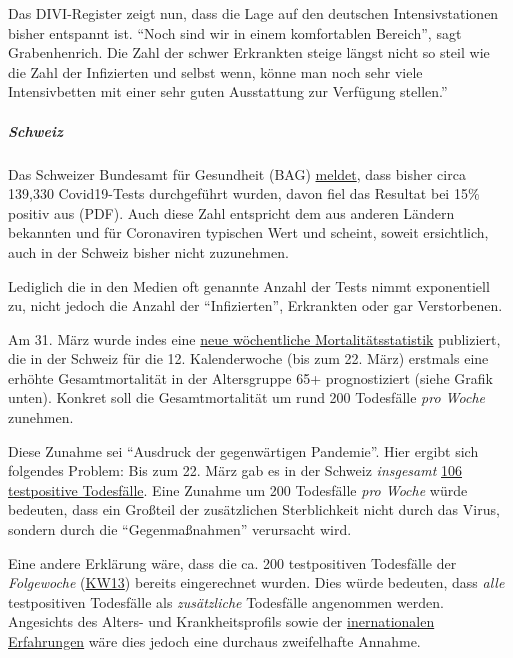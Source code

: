 Das DIVI-Register zeigt nun, dass die Lage auf den deutschen
Intensivstationen bisher entspannt ist. ``Noch sind wir in einem
komfortablen Bereich'', sagt Grabenhenrich. Die Zahl der schwer
Erkrankten steige längst nicht so steil wie die Zahl der Infizierten und
selbst wenn, könne man noch sehr viele Intensivbetten mit einer sehr
guten Ausstattung zur Verfügung stellen.''

\hypertarget{schweiz-2}{%
\subparagraph{\texorpdfstring{\textbf{Schweiz}}{Schweiz}}\label{schweiz-2}}

Das Schweizer Bundesamt für Gesundheit (BAG)
\href{https://www.bag.admin.ch/bag/de/home/krankheiten/ausbrueche-epidemien-pandemien/aktuelle-ausbrueche-epidemien/novel-cov/situation-schweiz-und-international.html}{meldet},
dass bisher circa 139,330 Covid19-Tests durchgeführt wurden, davon fiel
das Resultat bei 15\% positiv aus (PDF). Auch diese Zahl entspricht dem
aus anderen Ländern bekannten und für Coronaviren typischen Wert und
scheint, soweit ersichtlich, auch in der Schweiz bisher nicht
zuzunehmen.

Lediglich die in den Medien oft genannte Anzahl der Tests nimmt
exponentiell zu, nicht jedoch die Anzahl der ``Infizierten'', Erkrankten
oder gar Verstorbenen.

Am 31. März wurde indes eine
\href{https://www.bfs.admin.ch/bfs/de/home/statistiken/gesundheit/gesundheitszustand/sterblichkeit-todesursachen.html}{neue
wöchentliche Mortalitätsstatistik} publiziert, die in der Schweiz für
die 12. Kalenderwoche (bis zum 22. März) erstmals eine erhöhte
Gesamtmortalität in der Altersgruppe 65+ prognostiziert (siehe Grafik
unten). Konkret soll die Gesamtmortalität um rund 200 Todesfälle
\emph{pro Woche} zunehmen.

Diese Zunahme sei ``Ausdruck der gegenwärtigen Pandemie''. Hier ergibt
sich folgendes Problem: Bis zum 22. März gab es in der Schweiz
\emph{insgesamt}
\href{https://de.wikipedia.org/wiki/COVID-19-Pandemie_in_der_Schweiz\#Todesf\%C3\%A4lle}{106
testpositive Todesfälle}. Eine Zunahme um 200 Todesfälle \emph{pro
Woche} würde bedeuten, dass ein Großteil der zusätzlichen Sterblichkeit
nicht durch das Virus, sondern durch die ``Gegenmaßnahmen'' verursacht
wird.

Eine andere Erklärung wäre, dass die ca. 200 testpositiven Todesfälle
der \emph{Folgewoche}
(\href{https://de.wikipedia.org/wiki/COVID-19-Pandemie_in_der_Schweiz\#Todesf\%C3\%A4lle}{KW13})
bereits eingerechnet wurden. Dies würde bedeuten, dass \emph{alle}
testpositiven Todesfälle als \emph{zusätzliche} Todesfälle angenommen
werden. Angesichts des Alters- und Krankheitsprofils sowie der
\href{https://swprs.org/rki-relativiert-corona-todesfaelle/}{inernationalen
Erfahrungen} wäre dies jedoch eine durchaus zweifelhafte Annahme.

